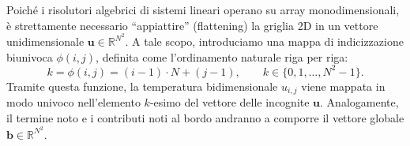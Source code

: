 \documentclass[a4paper,12pt]{article}
\begin{document}
Poiché i risolutori algebrici di sistemi lineari operano su array monodimensionali, è strettamente necessario ``appiattire'' (flattening) la griglia 2D in un vettore unidimensionale $\mathbf{u} \in \mathbb{R}^{N^2}$. A tale scopo, introduciamo una mappa di indicizzazione biunivoca $\phi(i,j)$, definita come l'ordinamento naturale riga per riga:
\begin{equation}
    k = \phi(i,j) = (i-1) \cdot N + (j-1), \qquad k \in \{0, 1, \dots, N^2-1\}.
\end{equation}
Tramite questa funzione, la temperatura bidimensionale $u_{i,j}$ viene mappata in modo univoco nell'elemento $k$-esimo del vettore delle incognite $\mathbf{u}$. Analogamente, il termine noto e i contributi noti al bordo andranno a comporre il vettore globale $\mathbf{b} \in \mathbb{R}^{N^2}$.
\end{document}

